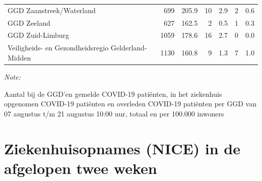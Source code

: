 \documentclass[
  english,
  man,floatsintext]{apa6}
\begin{document}
\begin{table}
\begin{threeparttable}
\begin{tabular}{lrrrrrr}
GGD Zaanstreek/Waterland & 699 & 205.9 & 10 & 2.9 & 2 & 0.6\\
GGD Zeeland & 627 & 162.5 & 2 & 0.5 & 1 & 0.3\\
GGD Zuid-Limburg & 1059 & 178.6 & 16 & 2.7 & 0 & 0.0\\
Veiligheids- en Gezondheidsregio Gelderland-Midden & 1130 & 160.8 & 9 & 1.3 & 7 & 1.0\\
\bottomrule
\end{tabular}
\begin{tablenotes}
\item \textit{Note: } 
\item Aantal bij de GGD’en gemelde COVID-19 patiënten, in het ziekenhuis opgenomen COVID-19 patiënten en overleden COVID-19 patiënten per GGD van 07 augustus t/m 21 augustus 10:00 uur, totaal en per 100.000 inwoners
\end{tablenotes}
\end{threeparttable}
\endgroup{}
\end{table}

\newpage

\hypertarget{ziekenhuisopnames-nice-in-de-afgelopen-twee-weken}{%
\section{Ziekenhuisopnames (NICE) in de afgelopen twee weken}\label{ziekenhuisopnames-nice-in-de-afgelopen-twee-weken}}
\end{document}
